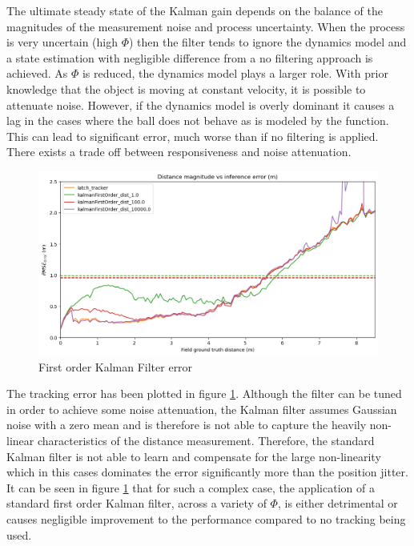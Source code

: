 \documentclass[a4paper,twoside,12pt]{report}
\begin{document}
The ultimate steady state of the Kalman gain depends on the balance of the magnitudes of the measurement noise and process uncertainty. When the process is very uncertain (high $\Phi$) then the filter tends to ignore the dynamics model and a state estimation with negligible difference from a no filtering approach is achieved. As $\Phi$ is reduced, the dynamics model plays a larger role. With prior knowledge that the object is moving at constant velocity, it is possible to attenuate noise. However, if the dynamics model is overly dominant it causes a lag in the cases where the ball does not behave as is modeled by the function. This can lead to significant error, much worse than if no filtering is applied. There exists a trade off between responsiveness and noise attenuation.

\begin{figure}[h!]
\begin{center}
\includegraphics[width=14cm]{images/fok_error.png}
\caption{First order Kalman Filter error}
\label{fig:fokerror}
\end{center}
\end{figure}

The tracking error has been plotted in figure \ref{fig:fokerror}. Although the filter can be tuned in order to achieve some noise attenuation, the Kalman filter assumes Gaussian noise with a zero mean and is therefore is not able to capture the heavily non-linear characteristics of the distance measurement. Therefore, the standard Kalman filter is not able to learn and compensate for the large non-linearity which in this cases dominates the error significantly more than the position jitter. It can be seen in figure \ref{fig:fokerror} that for such a complex case, the application of a standard first order Kalman filter, across a variety of $\Phi$, is either detrimental or causes negligible improvement to the performance compared to no tracking being used.
\end{document}
